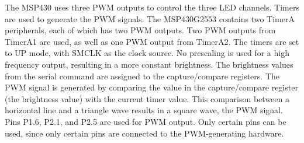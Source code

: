 The MSP430 uses three PWM outputs to control the three LED channels. Timers are used to generate the PWM signals. The MSP430G2553 contains two TimerA peripherals, each of which has two PWM outputs. Two PWM outputs from TimerA1 are used, as well as one PWM output from TimerA2. The timers are set to UP mode, with SMCLK as the clock source. No prescaling is used for a high frequency output, resulting in a more constant brightness. The brightness values from the serial command are assigned to the capture/compare registers. The PWM signal is generated by comparing the value in the capture/compare register (the brightness value) with the current timer value. This comparison between a horizontal line and a triangle wave results in a square wave, the PWM signal. Pins P1.6, P2.1, and P2.5 are used for PWM output. Only certain pins can be used, since only certain pins are connected to the PWM-generating hardware.
